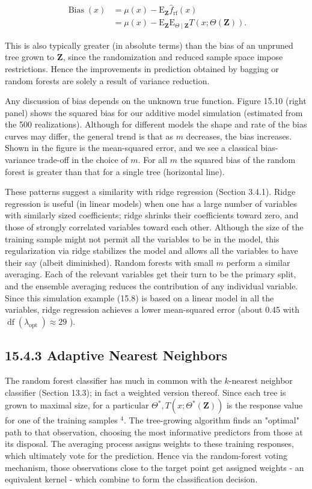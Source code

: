 \documentclass[10pt]{article}
\begin{document}
\begin{align*}
\operatorname{Bias}(x) & =\mu(x)-\mathrm{E}_{\mathbf{Z}} \hat{f}_{\mathrm{rf}}(x) \\
& =\mu(x)-\mathrm{E}_{\mathbf{Z}} \mathrm{E}_{\Theta \mid \mathbf{Z}} T(x ; \Theta(\mathbf{Z})) . \tag{15.10}
\end{align*}


This is also typically greater (in absolute terms) than the bias of an unpruned tree grown to $\mathbf{Z}$, since the randomization and reduced sample space impose restrictions. Hence the improvements in prediction obtained by bagging or random forests are solely a result of variance reduction.

Any discussion of bias depends on the unknown true function. Figure 15.10 (right panel) shows the squared bias for our additive model simulation (estimated from the 500 realizations). Although for different models the shape and rate of the bias curves may differ, the general trend is that as $m$ decreases, the bias increases. Shown in the figure is the mean-squared error, and we see a classical bias-variance trade-off in the choice of $m$. For all $m$ the squared bias of the random forest is greater than that for a single tree (horizontal line).

These patterns suggest a similarity with ridge regression (Section 3.4.1). Ridge regression is useful (in linear models) when one has a large number of variables with similarly sized coefficients; ridge shrinks their coefficients toward zero, and those of strongly correlated variables toward each other. Although the size of the training sample might not permit all the variables to be in the model, this regularization via ridge stabilizes the model and allows all the variables to have their say (albeit diminished). Random forests with small $m$ perform a similar averaging. Each of the relevant variables get their turn to be the primary split, and the ensemble averaging reduces the contribution of any individual variable. Since this simulation example (15.8) is based on a linear model in all the variables, ridge regression achieves a lower mean-squared error (about 0.45 with $\operatorname{df}\left(\lambda_{\text {opt }}\right) \approx 29$ ).

\subsection*{15.4.3 Adaptive Nearest Neighbors}
The random forest classifier has much in common with the $k$-nearest neighbor classifier (Section 13.3); in fact a weighted version thereof. Since each tree is grown to maximal size, for a particular $\Theta^{*}, T\left(x ; \Theta^{*}(\mathbf{Z})\right)$ is the response value for one of the training samples ${ }^{4}$. The tree-growing algorithm finds an "optimal" path to that observation, choosing the most informative predictors from those at its disposal. The averaging process assigns weights to these training responses, which ultimately vote for the prediction. Hence via the random-forest voting mechanism, those observations close to the target point get assigned weights - an equivalent kernel - which combine to form the classification decision.
\end{document}
